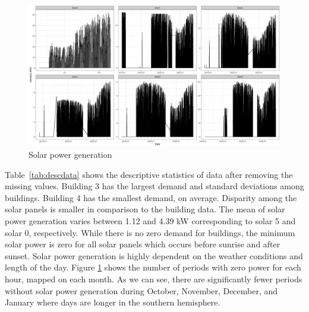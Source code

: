 \documentclass[conference]{IEEEtran}
\begin{document}
\begin{figure}[htbp]
\centerline{\includegraphics[scale=0.15]{solars.png}}
\caption{Solar power generation}
\label{fig:solars}
\end{figure}


Table~\ref{tab:descdata} shows the descriptive statistics of data after removing the missing values. Building 3 has the largest demand and standard deviations among buildings. Building 4 has the smallest demand, on average. Disparity among the solar panels is smaller in comparison to the building data. The mean of solar power generation varies between 1.12 and 4.39 kW corresponding to solar 5 and solar 0, respectively. While there is no zero demand for buildings, the minimum solar power is zero for all solar panels which occurs before sunrise and after sunset. Solar power generation is highly dependent on the weather conditions and length of the day. Figure \ref{fig:solars} shows the number of periods with zero power for each hour, mapped on each month. As we can see, there are significantly fewer periods without solar power generation during October, November, December, and January where days are longer in the southern hemisphere. 

\end{document}
